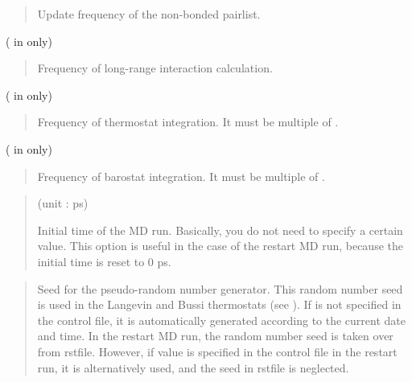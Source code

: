 \documentclass[a4paper,11pt,oneside,english]{sphinxmanual}
\begin{document}
 
\begin{quote}


Update frequency of the non-bonded pairlist.
\end{quote}

  ( in  only)
\begin{quote}


Frequency of long-range interaction calculation.
\end{quote}

  ( in  only)
\begin{quote}


Frequency of thermostat integration. It must be multiple of .
\end{quote}

  ( in  only)
\begin{quote}


Frequency of barostat integration. It must be multiple of .
\end{quote}

 
\begin{quote}

 (unit : ps)

Initial time of the MD run. Basically, you do not need to specify a certain value.
This option is useful in the case of the restart MD run, because the initial time is reset to 0 ps.
\end{quote}

 
\begin{quote}


Seed for the pseudo-random number generator.
This random number seed is used in the Langevin and Bussi thermostats (see ).
If  is not specified in the control file,
it is automatically generated according to the current date and time.
In the restart MD run, the random number seed is taken over from rstfile.
However, if  value is specified in the control file in the restart run,
it is alternatively used, and the seed in rstfile is neglected.
\end{quote}
\end{document}
